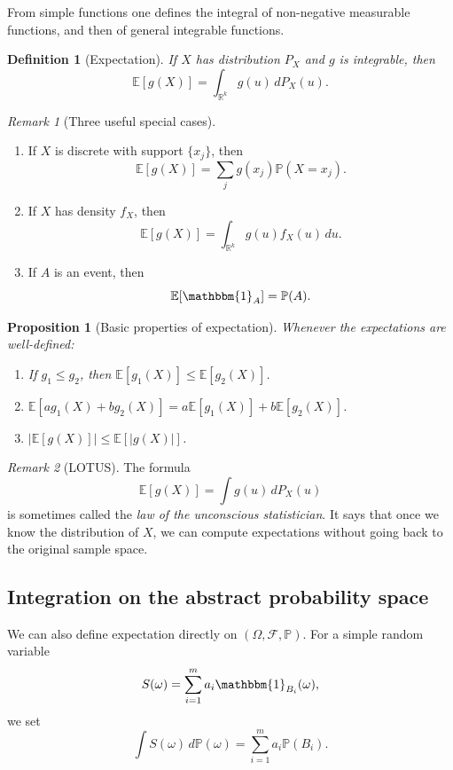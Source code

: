 \documentclass[11pt]{article}
\newtheorem{definition}{Definition}[section]
\newtheorem{proposition}{Proposition}[section]
\theoremstyle{remark}
\newtheorem{remark}{Remark}[section]
\newcommand{\R}{\mathbb{R}}
\newcommand{\PP}{\mathbb{P}}
\newcommand{\EE}{\mathbb{E}}
\newcommand{\1}{\mathbbm{1}}
\newcommand{\cF}{\mathcal{F}}
\begin{document}
From simple functions one defines the integral of non-negative measurable functions, and then of general integrable functions.

\begin{definition}[Expectation]
If \(X\) has distribution \(P_X\) and \(g\) is integrable, then
\[
  \EE[g(X)] = \int_{\R^k} g(u)\,dP_X(u).
\]
\end{definition}

\begin{remark}[Three useful special cases]
\begin{enumerate}[label=(\roman*)]
  \item If \(X\) is discrete with support \(\{x_j\}\), then
  \[
    \EE[g(X)] = \sum_j g(x_j)\PP(X=x_j).
  \]
  \item If \(X\) has density \(f_X\), then
  \[
    \EE[g(X)] = \int_{\R^k} g(u)f_X(u)\,du.
  \]
  \item If \(A\) is an event, then
  \[
    \EE[\1_A]=\PP(A).
  \]
\end{enumerate}
\end{remark}

\begin{proposition}[Basic properties of expectation]
Whenever the expectations are well-defined:
\begin{enumerate}[label=(\alph*)]
  \item If \(g_1 \le g_2\), then \(\EE[g_1(X)] \le \EE[g_2(X)]\).
  \item \(\EE[a g_1(X) + b g_2(X)] = a\EE[g_1(X)] + b\EE[g_2(X)]\).
  \item \(|\EE[g(X)]| \le \EE[|g(X)|]\).
\end{enumerate}
\end{proposition}

\begin{remark}[LOTUS]
The formula
\[
  \EE[g(X)] = \int g(u)\,dP_X(u)
\]
is sometimes called the \emph{law of the unconscious statistician}. It says that once we know the distribution of \(X\), we can compute expectations without going back to the original sample space.
\end{remark}

\subsection{Integration on the abstract probability space}

We can also define expectation directly on \((\Omega,\cF,\PP)\). For a simple random variable
\[
  S(\omega)=\sum_{i=1}^{m} a_i \1_{B_i}(\omega),
\]
we set
\[
  \int S(\omega)\,d\PP(\omega)=\sum_{i=1}^{m} a_i \PP(B_i).
\]
\end{document}
